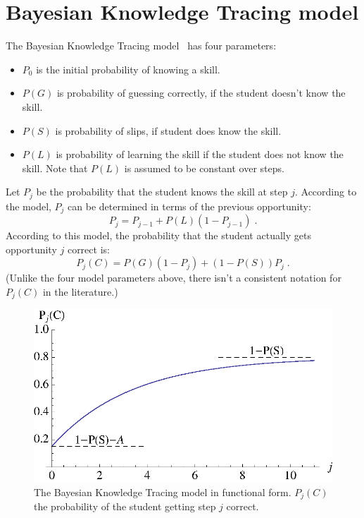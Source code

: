 \documentclass{acmlarge-edm}
\begin{document}
\section{Bayesian Knowledge Tracing model}

The Bayesian Knowledge Tracing model~\cite{corbett_knowledge_1994} has four parameters:
%
\begin{itemize}
   \item $P_0$ is the initial probability of knowing a skill.
   \item $P(G)$ is probability of guessing correctly, if the student        
         doesn't know the skill.
   \item $P(S)$ is probability of slips, if student does know the skill.
   \item $P(L)$ is probability of learning the skill if the student 
         does not know the skill.  Note that $P(L)$ is assumed to 
         be constant over steps.
\end{itemize}
%
Let $P_j$ be the probability that the student knows the skill at 
step $j$. According to the model,  $P_j$ can
be determined in terms of the previous opportunity:
%
\begin{equation}
          P_j = P_{j-1} + P(L)\left(1-P_{j-1}\right)  \; . \label{recurse}
\end{equation}
%
According to this model, the probability that the student actually gets
opportunity $j$ correct is:
%
\begin{equation}
         P_j(C) = P(G)\left(1-P_j\right) + \left(1-P(S)\right) P_j \; . \label{pnc}
\end{equation}
%
(Unlike the four model parameters above, there isn't a consistent
notation for $P_j(C)$ in the literature.)

\begin{figure}
\centering\includegraphics{exponential.eps}
\caption{The Bayesian Knowledge Tracing model in functional form. 
          $P_j(C)$ the probability of  the student getting step $j$ correct.}
 \label{bktgraph}
\end{figure}
\end{document}
